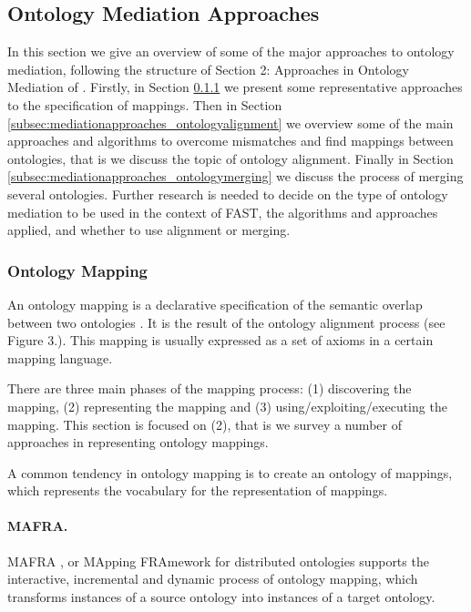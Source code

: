 \subsection{Ontology Mediation Approaches}
\label{sec:mediationapproaches}
In this section we give an overview of some of the major approaches to
ontology mediation, following the structure of Section 2: Approaches in
Ontology Mediation of \cite{debruin2005wsml}. Firstly, in Section
\ref{subsec:mediationapproaches_ontologymapping} we present some representative approaches to the specification of
mappings. Then in Section \ref{subsec:mediationapproaches_ontologyalignment} we overview some of the main approaches
and algorithms to overcome mismatches and find mappings between
ontologies, that is we discuss the topic of ontology alignment. Finally
in Section \ref{subsec:mediationapproaches_ontologymerging} we discuss the process of merging several ontologies.
Further research is needed to decide on the type of ontology mediation
to be used in the context of FAST, the algorithms and approaches
applied, and whether to use alignment or merging. 

\subsubsection{Ontology Mapping}
\label{subsec:mediationapproaches_ontologymapping}
An ontology mapping is a declarative specification of the semantic
overlap between two ontologies \cite{debruin2005wsml}. It is the
result of the ontology alignment process (see Figure 3.). This mapping
is usually expressed as a set of axioms in a certain mapping language. 

There are three main phases of the mapping process: (1) discovering the
mapping, (2) representing the mapping and (3)
using/exploiting/executing the mapping. This section is focused on (2),
that is we survey a number of approaches in representing ontology
mappings. 

A common tendency in ontology mapping is to create an ontology of
mappings, which represents the vocabulary for the representation of
mappings. 

\paragraph{MAFRA.}
MAFRA \cite{maedche2002mafra}, or MApping FRAmework for distributed
ontologies supports the interactive, incremental and dynamic process of
ontology mapping, which transforms instances of a source ontology into
instances of a target ontology. 

